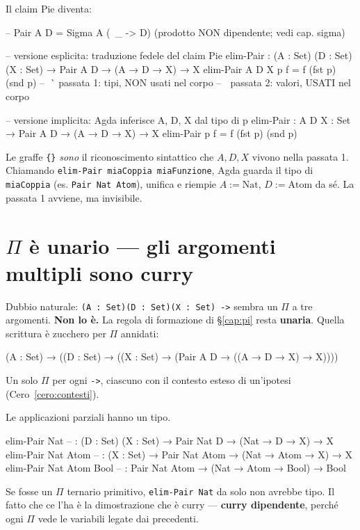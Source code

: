 Il claim Pie diventa:

\begin{agda}
-- Pair A D = Sigma A (\ _ -> D)  (prodotto NON dipendente; vedi cap. sigma)

-- versione esplicita: traduzione fedele del claim Pie
elim-Pair : (A : Set) (D : Set) (X : Set) → Pair A D → (A → D → X) → X
elim-Pair A D X p f = f (fst p) (snd p)
--        ^^^^^                          passata 1: tipi, NON usati nel corpo
--              ^^^                       passata 2: valori, USATI nel corpo

-- versione implicita: Agda inferisce A, D, X dal tipo di p
elim-Pair : {A D X : Set} → Pair A D → (A → D → X) → X
elim-Pair p f = f (fst p) (snd p)
\end{agda}

Le graffe \texttt{\{\}} \emph{sono} il riconoscimento sintattico che $A, D, X$ vivono nella passata 1. Chiamando \texttt{elim-Pair miaCoppia miaFunzione}, Agda guarda il tipo di \texttt{miaCoppia} (es. \texttt{Pair Nat Atom}), unifica e riempie $A := \mathrm{Nat}$, $D := \mathrm{Atom}$ da s\'e. La passata 1 avviene, ma invisibile.

\section*{$\Pi$ \`e unario --- gli argomenti multipli sono curry}

Dubbio naturale: \texttt{(A : Set)(D : Set)(X : Set) ->} sembra un $\Pi$ a tre argomenti. \textbf{Non lo \`e.} La regola di formazione di \S\ref{cap:pi} resta \textbf{unaria}. Quella scrittura \`e zucchero per $\Pi$ annidati:

\begin{agda}
(A : Set) → ((D : Set) → ((X : Set) → (Pair A D → ((A → D → X) → X))))
\end{agda}

Un solo $\Pi$ per ogni \texttt{->}, ciascuno con il contesto esteso di un'ipotesi (Cero~\ref{cero:contesti}).

\begin{oss}
Le applicazioni parziali hanno un tipo.
\begin{agda}
elim-Pair Nat            -- : (D : Set) (X : Set) → Pair Nat D → (Nat → D → X) → X
elim-Pair Nat Atom       -- : (X : Set) → Pair Nat Atom → (Nat → Atom → X) → X
elim-Pair Nat Atom Bool  -- : Pair Nat Atom → (Nat → Atom → Bool) → Bool
\end{agda}

Se fosse un $\Pi$ ternario primitivo, \texttt{elim-Pair Nat} da solo non avrebbe tipo. Il fatto che ce l'ha \`e la dimostrazione che \`e curry --- \textbf{curry dipendente}, perch\'e ogni $\Pi$ vede le variabili legate dai precedenti.
\end{oss}

